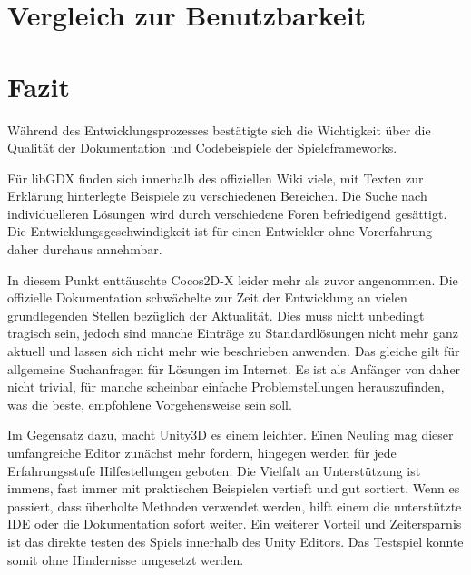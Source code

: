 



\chapter{Vergleich zur Benutzbarkeit}

\chapter{Fazit}



Während des Entwicklungsprozesses bestätigte sich die Wichtigkeit über die Qualität der Dokumentation und Codebeispiele der Spieleframeworks. 

\bigskip
Für libGDX finden sich innerhalb des offiziellen Wiki viele, mit Texten zur Erklärung hinterlegte Beispiele zu verschiedenen Bereichen. Die Suche nach individuelleren Lösungen wird durch verschiedene Foren befriedigend gesättigt. Die Entwicklungsgeschwindigkeit ist für einen Entwickler ohne Vorerfahrung daher durchaus annehmbar.

\bigskip
In diesem Punkt enttäuschte Cocos2D-X leider mehr als zuvor angenommen. Die offizielle Dokumentation schwächelte zur Zeit der Entwicklung an vielen grundlegenden Stellen bezüglich der Aktualität. Dies muss nicht unbedingt tragisch sein, jedoch sind manche Einträge zu Standardlösungen nicht mehr ganz aktuell und lassen sich nicht mehr wie beschrieben anwenden. Das gleiche gilt für allgemeine Suchanfragen für Lösungen im Internet. Es ist als Anfänger von daher nicht trivial, für manche scheinbar einfache Problemstellungen herauszufinden, was die beste, empfohlene Vorgehensweise sein soll.

\bigskip
Im Gegensatz dazu, macht Unity3D es einem leichter. Einen Neuling mag dieser umfangreiche Editor zunächst mehr fordern, hingegen werden für jede Erfahrungsstufe Hilfestellungen geboten. Die Vielfalt an Unterstützung ist immens, fast immer mit praktischen Beispielen vertieft und gut sortiert. Wenn es passiert, dass überholte Methoden verwendet werden, hilft einem die unterstützte IDE oder die Dokumentation sofort weiter. Ein weiterer Vorteil und Zeitersparnis ist das direkte testen des Spiels innerhalb des Unity Editors. Das Testspiel konnte somit ohne Hindernisse umgesetzt werden.

